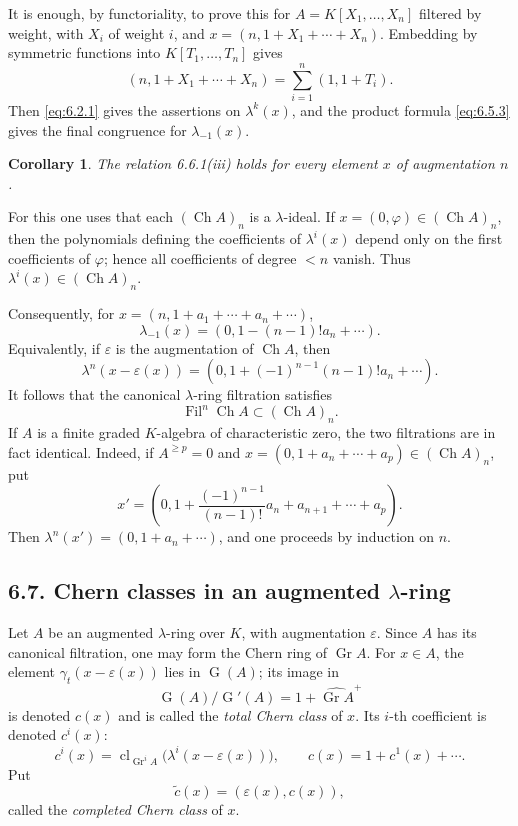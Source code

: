 \documentclass[11pt]{article}
\theoremstyle{plain}
\newtheorem{corollary}[theorem]{Corollary}
\theoremstyle{definition}
\theoremstyle{remark}
\DeclareMathOperator{\Gr}{Gr}
\DeclareMathOperator{\cl}{cl}
\providecommand{\Fil}{\operatorname{Fil}}
\providecommand{\Go}{\operatorname{G}}
\providecommand{\Ch}{\operatorname{Ch}}
\begin{document}
It is enough, by functoriality, to prove this for $A=K[X_1,\ldots,X_n]$ filtered by weight, with $X_i$ of weight $i$, and $x=(n,1+X_1+\cdots+X_n)$. Embedding by symmetric functions into $K[T_1,\ldots,T_n]$ gives
\[
(n,1+X_1+\cdots+X_n)=\sum_{i=1}^{n}(1,1+T_i).
\]
Then \eqref{eq:6.2.1} gives the assertions on $\lambda^k(x)$, and the product formula \eqref{eq:6.5.3} gives the final congruence for $\lambda_{-1}(x)$.

\begin{corollary}\label{cor:6.6.2}
The relation 6.6.1(iii) holds for every element $x$ of augmentation $n$.
\end{corollary}

For this one uses that each $(\Ch A)_n$ is a $\lambda$-ideal. If $x=(0,\varphi)\in(\Ch A)_n$, then the polynomials defining the coefficients of $\lambda^i(x)$ depend only on the first coefficients of $\varphi$; hence all coefficients of degree $<n$ vanish. Thus $\lambda^i(x)\in(\Ch A)_n$.

Consequently, for $x=(n,1+a_1+\cdots+a_n+\cdots)$,
\[
\lambda_{-1}(x)=(0,1-(n-1)!a_n+\cdots).
\]
Equivalently, if $\varepsilon$ is the augmentation of $\Ch A$, then
\begin{equation}\label{eq:6.6.4}
\lambda^n(x-\varepsilon(x))=(0,1+(-1)^{n-1}(n-1)!a_n+\cdots).
\end{equation}
It follows that the canonical $\lambda$-ring filtration satisfies
\begin{equation}\label{eq:6.6.5}
\Fil^n\Ch A\subset(\Ch A)_n.
\end{equation}
If $A$ is a finite graded $K$-algebra of characteristic zero, the two filtrations are in fact identical. Indeed, if $A^{\geq p}=0$ and $x=(0,1+a_n+\cdots+a_p)\in(\Ch A)_n$, put
\[
x'=\left(0,1+\frac{(-1)^{n-1}}{(n-1)!}a_n+a_{n+1}+\cdots+a_p\right).
\]
Then $\lambda^n(x')=(0,1+a_n+\cdots)$, and one proceeds by induction on $n$.

\subsection*{6.7. Chern classes in an augmented $\lambda$-ring}
Let $A$ be an augmented $\lambda$-ring over $K$, with augmentation $\varepsilon$. Since $A$ has its canonical filtration, one may form the Chern ring of $\Gr A$. For $x\in A$, the element $\gamma_t(x-\varepsilon(x))$ lies in $\Go(A)$; its image in
\[
\Go(A)/\Go'(A)=1+\widehat{\Gr A}^+
\]
is denoted $c(x)$ and is called the \emph{total Chern class} of $x$. Its $i$-th coefficient is denoted $c^i(x)$:
\begin{equation}\label{eq:6.7.1}
c^i(x)=\cl_{\Gr^iA}\bigl(\lambda^i(x-\varepsilon(x))\bigr),
\qquad
c(x)=1+c^1(x)+\cdots.
\end{equation}
Put
\begin{equation}\label{eq:6.7.2}
\widetilde c(x)=(\varepsilon(x),c(x)),
\end{equation}
called the \emph{completed Chern class} of $x$.
\end{document}
